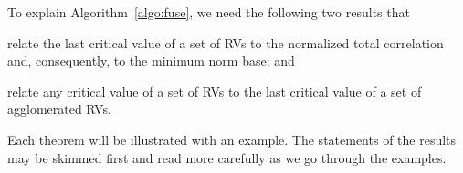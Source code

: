 %
%

To explain Algorithm~\ref{algo:fuse}, we need the following two results that
\begin{inparaenum}
\item 
relate the last critical value of a set of RVs to the normalized total correlation and,
consequently,
to the minimum norm base; and
\item 
relate any critical value of a set of RVs to the last critical value of a set of agglomerated RVs.
\end{inparaenum}
Each theorem will be illustrated with an example. %
The statements of the results may be
skimmed first and read more carefully as we go through the examples.

